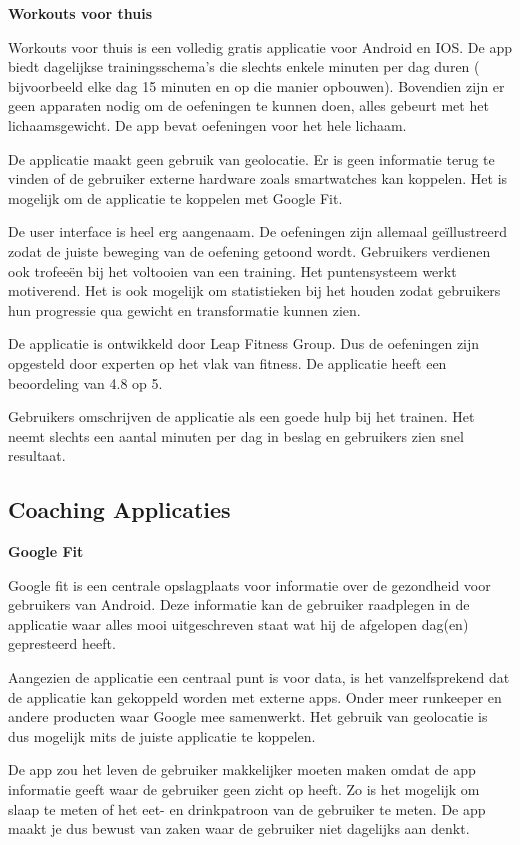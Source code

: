 \textbf{Workouts voor thuis}

Workouts voor thuis is een volledig gratis applicatie voor Android en IOS. De app biedt dagelijkse trainingsschema’s die slechts enkele minuten per dag duren ( bijvoorbeeld elke dag 15 minuten en op die manier opbouwen). Bovendien zijn er geen apparaten nodig om de oefeningen te kunnen doen, alles gebeurt met het lichaamsgewicht. De app bevat oefeningen voor het hele lichaam.

De applicatie maakt geen gebruik van geolocatie. Er is geen informatie terug te vinden of de gebruiker externe hardware zoals smartwatches kan koppelen. Het is mogelijk om de applicatie te koppelen met Google Fit.

De user interface is heel erg aangenaam. De oefeningen zijn allemaal geïllustreerd zodat de juiste beweging van de oefening getoond wordt. Gebruikers verdienen ook trofeeën bij het voltooien van een training. Het puntensysteem werkt motiverend. Het is ook mogelijk om statistieken bij het houden zodat gebruikers hun progressie qua gewicht en transformatie kunnen zien.

De applicatie is ontwikkeld door Leap Fitness Group. Dus de oefeningen zijn opgesteld door experten op het vlak van fitness. De applicatie heeft een beoordeling van 4.8 op 5.

Gebruikers omschrijven de applicatie als een goede hulp bij het trainen. Het neemt slechts een aantal minuten per dag in beslag en gebruikers zien snel resultaat. 

\subsection{Coaching Applicaties }

\textbf{Google Fit}

Google fit is een centrale opslagplaats voor informatie over de gezondheid voor gebruikers van Android. Deze informatie kan de gebruiker raadplegen in de applicatie waar alles mooi uitgeschreven staat wat hij de afgelopen dag(en) gepresteerd heeft.

Aangezien de applicatie een centraal punt is voor data, is het vanzelfsprekend dat de applicatie kan gekoppeld worden met externe apps. Onder meer runkeeper en andere producten waar Google mee samenwerkt. Het gebruik van geolocatie is dus mogelijk mits de juiste applicatie te koppelen. 

De app zou het leven de gebruiker makkelijker moeten maken omdat de app informatie geeft waar de gebruiker geen zicht op heeft. Zo is het mogelijk om slaap te meten of het eet- en drinkpatroon van de gebruiker te meten. De app maakt je dus bewust van zaken waar de gebruiker niet dagelijks aan denkt. 

